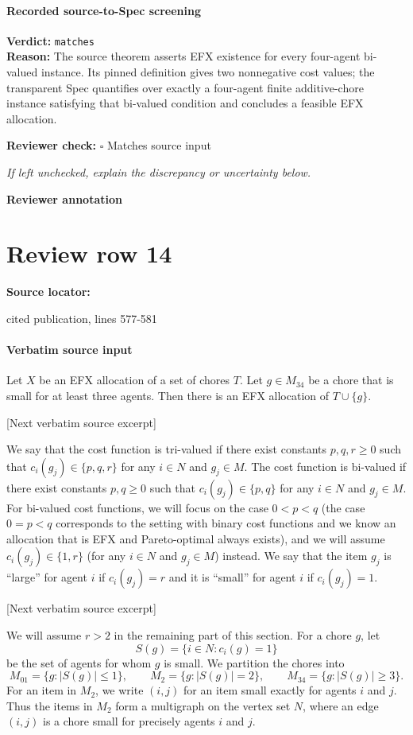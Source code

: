 \documentclass[10pt]{article}
\newcommand{\reviewerbox}{%
  \par\noindent\fbox{\parbox{0.96\linewidth}{\rule{0pt}{0.38in}}}\par
}
\newcommand{\reviewmatch}[1]{%
  \par\noindent\textbf{Reviewer check:} $\square$\; #1\par
  \noindent\emph{If left unchecked, explain the discrepancy or uncertainty below.}\par
}
\begin{document}
\paragraph{Recorded source-to-Spec screening}
\textbf{Verdict:} \texttt{matches}
\\
\textbf{Reason:} The source theorem asserts EFX existence for every four-agent bi-valued instance. Its pinned definition gives two nonnegative cost values; the transparent Spec quantifies over exactly a four-agent finite additive-chore instance satisfying that bi-valued condition and concludes a feasible EFX allocation.
\reviewmatch{Matches source input}
\noindent\textbf{Reviewer annotation}\par
\reviewerbox
\clearpage
\hypertarget{source-claim-e126eba4635c1cd5}{}
\section*{Review row 14}
\textbf{Source locator:} {\footnotesize\raggedright cited publication, lines 577-\allowbreak{}581\par}
\paragraph{Verbatim source input}
\begin{ReviewVerbatim}
\begin{lemma}\label{lem:insertion}
Let $X$ be an EFX allocation of a set of chores $T$.  Let $g\in M_{34}$ be a
chore that is small for at least three agents.  Then there is an EFX
allocation of $T\cup\{g\}$.
\end{lemma}

[Next verbatim source excerpt]

We say that the cost function is tri-valued if there exist constants $p,q,r\geq 0$ such that $c_i(g_j)\in\{p,q,r\}$ for any $i\in N$ and $g_j\in M$.
The cost function is bi-valued if there exist constants $p,q\geq 0$ such that $c_i(g_j)\in\{p,q\}$ for any $i\in N$ and $g_j\in M$.
For bi-valued cost functions, we will focus on the case $0<p<q$ (the case $0=p<q$ corresponds to the setting with binary cost functions and we know an allocation that is EFX and Pareto-optimal always exists), and we will assume $c_i(g_j)\in\{1,r\}$ (for any $i\in N$ and $g_j\in M$) instead.
We say that the item $g_j$ is ``large'' for agent $i$ if $c_i(g_j)=r$ and it is ``small'' for agent $i$ if $c_i(g_j)=1$.

[Next verbatim source excerpt]

We will assume $r>2$ in the remaining part of this section.
For a chore $g$, let
\[
 S(g)=\{i\in N:c_i(g)=1\}
\]
be the set of agents for whom $g$ is small.  We partition the chores into
\[
M_{01}=\{g:|S(g)|\le 1\},\qquad
M_2=\{g:|S(g)|=2\},\qquad
M_{34}=\{g:|S(g)|\ge 3\}.
\]
For an item in $M_2$, we write $(i,j)$ for an item small exactly for agents
$i$ and $j$.  Thus the items in $M_2$ form a multigraph on the vertex set
$N$, where an edge $(i,j)$ is a chore small for precisely agents $i$ and $j$.
\end{ReviewVerbatim}
\end{document}
